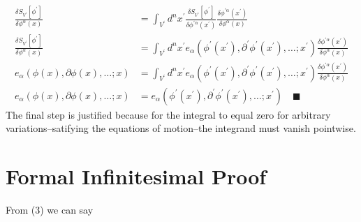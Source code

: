 \documentclass{article}
\begin{document}
\begin{align*}
	\frac{\delta S_{V^\prime} \left[\phi^\prime\right]}{\delta \phi^{\alpha}(x)} &= \int_{V^\prime}d^nx^\prime \frac{\delta S_{V^\prime} \left[\phi^\prime\right]}{\delta \phi^{\prime \alpha}(x^\prime)} \frac{\delta \phi^{\prime \alpha}(x^\prime)}{\delta \phi^{\alpha}(x)} \\
	\frac{\delta S_{V^\prime} \left[\phi^\prime\right]}{\delta \phi^{\alpha}(x)} &= \int_{V^\prime}d^nx^\prime e_\alpha\left(\phi^\prime(x^\prime),\partial^\prime \phi^\prime(x^\prime), \dots ; x^\prime \right) \frac{\delta \phi^{\prime \alpha}(x^\prime)}{\delta \phi^{\alpha}(x)} \\
	e_{\alpha}(\phi(x),\partial\phi(x),\ldots ; x) &= \int_{V^\prime}d^nx^\prime e_\alpha\left(\phi^\prime(x^\prime),\partial^\prime \phi^\prime(x^\prime), \dots ; x^\prime \right) \frac{\delta \phi^{\prime \alpha}(x^\prime)}{\delta \phi^{\alpha}(x)} \\
	e_{\alpha}(\phi(x),\partial\phi(x),\ldots ; x) &= e_\alpha\left(\phi^\prime(x^\prime),\partial^\prime \phi^\prime(x^\prime), \dots ; x^\prime \right) \quad \blacksquare
\end{align*}
The final step is justified because for the integral to equal zero for arbitrary variations--satifying the equations of motion--the integrand must vanish pointwise.

\section{Formal Infinitesimal Proof}
From (3) we can say
\end{document}
